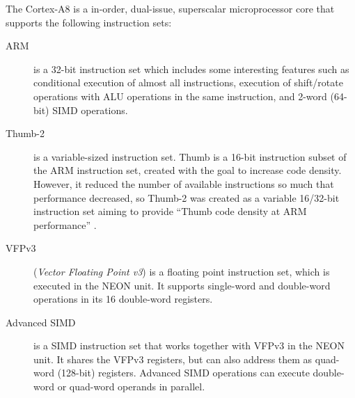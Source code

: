 \documentclass[oneside,a4paper]{report}
\begin{document}
The Cortex-A8 is a in-order, dual-issue, superscalar microprocessor core that supports the following instruction sets:
\begin{description}
	\item[ARM] is a 32-bit instruction set which includes some interesting features such as conditional execution of almost all instructions, execution of shift/rotate operations with ALU operations in the same instruction, and 2-word (64-bit) SIMD operations.
	
	\item[Thumb-2] is a variable-sized instruction set. Thumb is a 16-bit instruction subset of the ARM instruction set, created with the goal to increase code density. However, it reduced the number of available instructions so much that performance decreased, so Thumb-2 was created as a variable 16/32-bit instruction set aiming to provide ``Thumb code density at ARM performance'' \cite[p. 5]{Gris}.
	
	\item[VFPv3] (\emph{Vector Floating Point v3}) is a floating point instruction set, which is executed in the NEON unit. It supports single-word and double-word operations in its 16 double-word registers.
	
	\item[Advanced SIMD] is a SIMD instruction set that works together with VFPv3 in the NEON unit. It shares the VFPv3 registers, but can also address them as quad-word (128-bit) registers. Advanced SIMD operations can execute double-word or quad-word operands in parallel.
\end{description}
\end{document}

